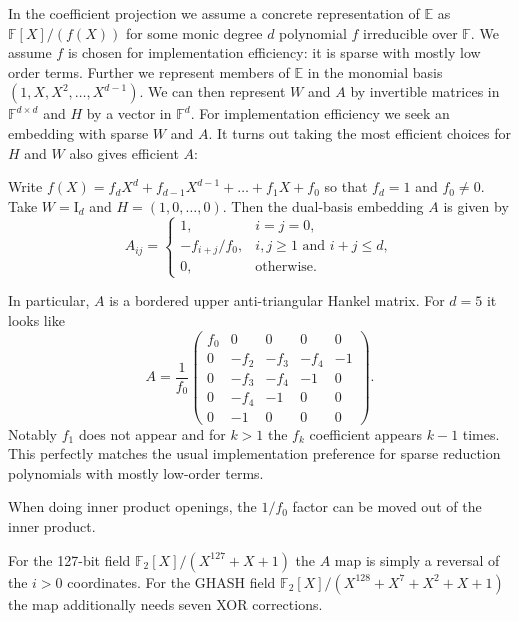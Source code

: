 In the coefficient projection we assume a concrete representation of $\mathbb{E}$ as $\mathbb{F}[X]/(f(X))$ for some monic degree $d$ polynomial $f$ irreducible over $\mathbb{F}$. We assume $f$ is chosen for implementation efficiency: it is sparse with mostly low order terms. Further we represent members of $\mathbb{E}$ in the monomial basis $(1, X, X^2, \dots, X^{d-1})$. We can then represent $W$ and $A$ by invertible matrices in $\mathbb{F}^{d \times d}$ and $H$ by a vector in $\mathbb{F}^d$. For implementation efficiency we seek an embedding with sparse $W$ and $A$. It turns out taking the most efficient choices for $H$ and $W$ also gives efficient $A$:

\begin{theorem}
Write  $f(X)= f_d X^d + f_{d-1} X^{d-1} + \hdots + f_1 X + f_0$ so that $f_d =1$ and $f_0 \neq 0$. Take $W=\mathrm{I}_d$ and $H=(1, 0, \dots, 0)$. Then the dual-basis embedding $A$ is given by
\[
A_{ij}=
\begin{cases}
1,&i=j=0,\\
-f_{i+j}/f_0,&i,j\ge1\text{ and }i+j\le d,\\
0,&\text{otherwise}.
\end{cases}
\]
\end{theorem}

In particular, $A$ is a bordered upper anti-triangular Hankel matrix. For $d=5$ it looks like
\[
A= \frac{1}{f_0}
\begin{pmatrix}
f_0 & 0 & 0 & 0 & 0\\
0 & -f_2 & -f_3 & -f_4 & -1\\
0 & -f_3 & -f_4 & -1 & 0\\
0 & -f_4 & -1 & 0 & 0\\
0 & -1 & 0 & 0 & 0
\end{pmatrix}.
\]
Notably $f_1$ does not appear and for $k>1$ the $f_k$ coefficient appears $k-1$ times. This perfectly matches the usual implementation preference for sparse reduction polynomials with mostly low-order terms.

When doing inner product openings, the $1/f_0$ factor can be moved out of the inner product. 

For the 127-bit field $\mathbb{F}_2[X]/(X^{127} + X + 1)$ the $A$ map is simply a reversal of the $i>0$ coordinates. For the GHASH field $\mathbb{F}_2[X]/(X^{128} + X^7 + X^2 + X + 1)$ the map additionally needs seven XOR corrections.



